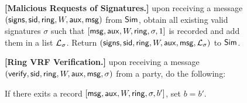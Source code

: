 \begin{figure}
\begin{tcolorbox}[left=2pt,right=2pt]
{			%
			
			\textbf{[Malicious Requests of  Signatures.]} upon receiving a message $ (\mathsf{signs}, \textsf{sid}, \mathsf{ring}, W, \mathsf{aux},\mathsf{msg}) $ from $ \mathsf{Sim} $, obtain all existing valid signatures $ \sigma $ such that $ [\mathsf{msg}, \mathsf{aux},W,\mathsf{ring},\sigma, 1] $ is recorded and add them in a list $ {\mathcal{L}}_{\sigma} $. 	Return $ (\mathsf{signs}, \textsf{sid}, \mathsf{ring}, W,\mathsf{aux},\mathsf{msg}, {\mathcal{L}}_{\sigma})  $ to $ \mathsf{Sim} $.
			
			\textbf{[Ring VRF Verification.]} upon receiving a message $(\mathsf{verify}, \textsf{sid}, \mathsf{ring},W, \mathsf{aux}, \mathsf{msg}, \sigma)$ from a party, do the following: 
				
				\begin{list}{\hspace*{1pt} C}{\setlength\leftmargin{0.15in}}
					\item If there exits a record $ [\mathsf{msg},\mathsf{aux},W,\mathsf{ring},\sigma, b'] $, set $ b = b' $. 
					

\end{list}}
\end{tcolorbox}
\end{figure}
